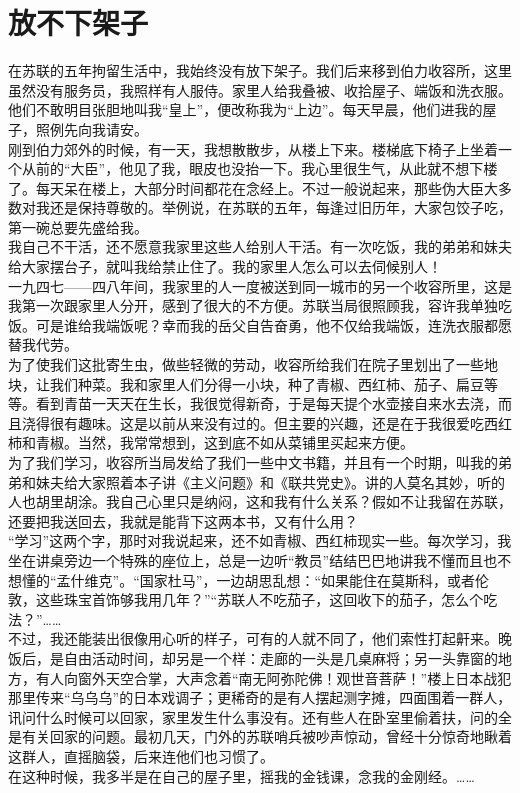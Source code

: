 \fancyhead[RO]{} %
\fancyhead[LE]{} %
\chapter*{放不下架子}
\thispagestyle{empty}
在苏联的五年拘留生活中，我始终没有放下架子。我们后来移到伯力收容所，这里虽然没有服务员，我照样有人服侍。家里人给我叠被、收拾屋子、端饭和洗衣服。他们不敢明目张胆地叫我“皇上”，便改称我为“上边”。每天早晨，他们进我的屋子，照例先向我请安。\\

刚到伯力郊外的时候，有一天，我想散散步，从楼上下来。楼梯底下椅子上坐着一个从前的“大臣”，他见了我，眼皮也没抬一下。我心里很生气，从此就不想下楼了。每天呆在楼上，大部分时间都花在念经上。不过一般说起来，那些伪大臣大多数对我还是保持尊敬的。举例说，在苏联的五年，每逢过旧历年，大家包饺子吃，第一碗总要先盛给我。\\

我自己不干活，还不愿意我家里这些人给别人干活。有一次吃饭，我的弟弟和妹夫给大家摆台子，就叫我给禁止住了。我的家里人怎么可以去伺候别人！\\

一九四七——四八年间，我家里的人一度被送到同一城市的另一个收容所里，这是我第一次跟家里人分开，感到了很大的不方便。苏联当局很照顾我，容许我单独吃饭。可是谁给我端饭呢？幸而我的岳父自告奋勇，他不仅给我端饭，连洗衣服都愿替我代劳。\\

为了使我们这批寄生虫，做些轻微的劳动，收容所给我们在院子里划出了一些地块，让我们种菜。我和家里人们分得一小块，种了青椒、西红柿、茄子、扁豆等等。看到青苗一天天在生长，我很觉得新奇，于是每天提个水壶接自来水去浇，而且浇得很有趣味。这是以前从来没有过的。但主要的兴趣，还是在于我很爱吃西红柿和青椒。当然，我常常想到，这到底不如从菜铺里买起来方便。\\

为了我们学习，收容所当局发给了我们一些中文书籍，并且有一个时期，叫我的弟弟和妹夫给大家照着本子讲《主义问题》和《联共党史》。讲的人莫名其妙，听的人也胡里胡涂。我自己心里只是纳闷，这和我有什么关系？假如不让我留在苏联，还要把我送回去，我就是能背下这两本书，又有什么用？\\

“学习”这两个字，那时对我说起来，还不如青椒、西红柿现实一些。每次学习，我坐在讲桌旁边一个特殊的座位上，总是一边听“教员”结结巴巴地讲我不懂而且也不想懂的“孟什维克”。“国家杜马”，一边胡思乱想：“如果能住在莫斯科，或者伦敦，这些珠宝首饰够我用几年？”“苏联人不吃茄子，这回收下的茄子，怎么个吃法？”……\\

不过，我还能装出很像用心听的样子，可有的人就不同了，他们索性打起鼾来。晚饭后，是自由活动时间，却另是一个样：走廊的一头是几桌麻将；另一头靠窗的地方，有人向窗外天空合掌，大声念着“南无阿弥陀佛！观世音菩萨！”楼上日本战犯那里传来“乌乌乌”的日本戏调子；更稀奇的是有人摆起测字摊，四面围着一群人，讯问什么时候可以回家，家里发生什么事没有。还有些人在卧室里偷着扶，问的全是有关回家的问题。最初几天，门外的苏联哨兵被吵声惊动，曾经十分惊奇地瞅着这群人，直摇脑袋，后来连他们也习惯了。\\

在这种时候，我多半是在自己的屋子里，摇我的金钱课，念我的金刚经。……
